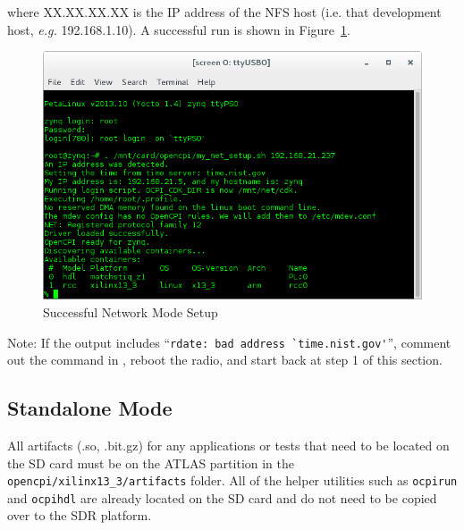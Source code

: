 \begin{enumerate}
\begin{flushleft}
where XX.XX.XX.XX is the IP address of the NFS host (i.e. that development host, \textit{e.g.} 192.168.1.10). A successful run is shown in Figure~\ref{fig:netsetup}.
\end{flushleft}

\begin{figure}[H]
	\centerline{\includegraphics[scale=0.5]{Matchstiq_Z1_net_setup}}
	\caption{Successful Network Mode Setup}
	\label{fig:netsetup}
\end{figure} \medskip

Note: If the output includes ``\verb+rdate: bad address `time.nist.gov'+'', comment out the  command in , reboot the radio, and start back at step 1 of this section.

\end{enumerate}

\pagebreak
\subsection{Standalone Mode}
All artifacts (.so, .bit.gz) for any applications or tests that need to be located on the SD card must be on the ATLAS partition in the \texttt{opencpi/xilinx13\_3/artifacts} folder.  All of the helper utilities such as \texttt{ocpirun} and \texttt{ocpihdl} are already located on the SD card and do not need to be copied over to the SDR platform.

